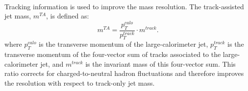 \paragraph{}
Tracking information is used to improve the mass resolution.
The track-assisted jet mass, $m^{TA}$, is defined as:
\begin{equation}
m^{TA} = \frac{p_T^{calo}}{p_T^{track}} \cdot m^{track}.
\end{equation}
where $p_{T}^{calo}$ is the transverse momentum of the large-\R calorimeter jet, $p_{T}^{track}$ is the transverse momentum of the four-vector sum of tracks associated to the large-\R calorimeter jet, and $m^{track}$ is the invariant mass of this four-vector sum.
This ratio corrects for charged-to-neutral hadron fluctuations and therefore improves the resolution with respect to track-only jet mass.

